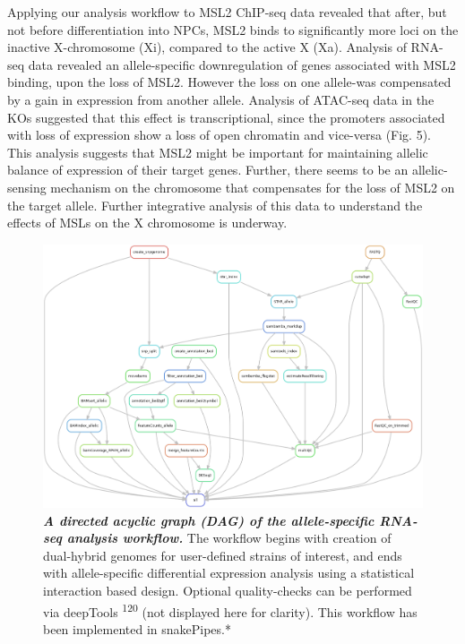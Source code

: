\documentclass[11pt,twoside]{MPIthesis}
\theoremstyle{definition}
\theoremstyle{definition}
\theoremstyle{definition}
\theoremstyle{remark}
\begin{document}
Applying our analysis workflow to MSL2 ChIP-seq data revealed that
after, but not before differentiation into NPCs, MSL2 binds to
significantly more loci on the inactive X-chromosome (Xi), compared to
the active X (Xa). Analysis of RNA-seq data revealed an allele-specific
downregulation of genes associated with MSL2 binding, upon the loss of
MSL2. However the loss on one allele-was compensated by a gain in
expression from another allele. Analysis of ATAC-seq data in the KOs
suggested that this effect is transcriptional, since the promoters
associated with loss of expression show a loss of open chromatin and
vice-versa (Fig. 5). This analysis suggests that MSL2 might be important
for maintaining allelic balance of expression of their target genes.
Further, there seems to be an allelic-sensing mechanism on the
chromosome that compensates for the loss of MSL2 on the target allele.
Further integrative analysis of this data to understand the effects of
MSLs on the X chromosome is underway.
\begin{figure}

{\centering \includegraphics[width=0.95\linewidth,height=0.5\textheight]{figures/results_fig8} 

}

\caption[A directed acyclic graph (DAG) of the allele-specific RNA-seq analysis workflow]{\emph{\textbf{A directed acyclic graph (DAG) of the
allele-specific RNA-seq analysis workflow.} }The workflow begins with
creation of dual-hybrid genomes for user-defined strains of interest,
and ends with allele-specific differential expression analysis using a
statistical interaction based design. Optional quality-checks can be
performed via deepTools \textsuperscript{120} (not displayed here for
clarity). This workflow has been implemented in snakePipes.*}\label{fig:unnamed-chunk-13}
\end{figure}
\end{document}
